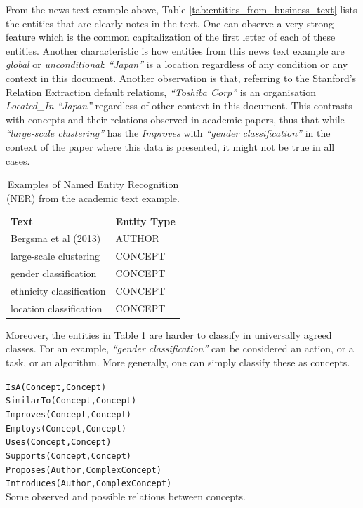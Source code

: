 \documentclass[11pt,a4paper,openright]{memoir}
\begin{document}
From the news text example above, Table \ref{tab:entities_from_business_text} lists the entities that are clearly notes in the text. One can observe a very strong feature which is the common capitalization of the first letter of each of these entities. Another characteristic is how entities from this news text example are \emph{global} or \emph{unconditional}: \emph{\enquote{Japan}} is a location regardless of any condition or any context in this document. Another observation is that, referring to the Stanford's Relation Extraction default relations, \emph{\enquote{Toshiba Corp}} is an organisation \emph{Located\_In} \emph{\enquote{Japan}} regardless of other context in this document. This contrasts with concepts and their relations observed in academic papers, thus that while \emph{\enquote{large-scale clustering}} has the \emph{Improves} with \emph{\enquote{gender classification}} in the context of the paper where this data is presented, it might not be true in all cases.

\begin{table}[!htbp]
  \centering
    \begin{tabular}{ll}
      \textbf{Text}             & \textbf{Entity Type} \\
      Bergsma et al (2013)      & AUTHOR          \\
      large-scale clustering    & CONCEPT         \\
      gender classification     & CONCEPT         \\
      ethnicity classification  & CONCEPT         \\
      location classification   & CONCEPT         \\
    \end{tabular}
  \caption[NER from the academic text example.]{Examples of Named Entity Recognition (NER) from the academic text example.}
  \label{tab:entities_from_academic_text}
\end{table}

Moreover, the entities in Table \ref{tab:entities_from_academic_text} are harder to classify in universally agreed classes. For an example, \emph{\enquote{gender classification}} can be considered an action, or a task, or an algorithm. More generally, one can simply classify these as concepts.

\begin{table}[!htbp]
  \centering
  \RaggedRight
    \texttt{IsA(Concept,Concept)} \\
    \texttt{SimilarTo(Concept,Concept)} \\
    \texttt{Improves(Concept,Concept)} \\
    \texttt{Employs(Concept,Concept)} \\
    \texttt{Uses(Concept,Concept)} \\
    \texttt{Supports(Concept,Concept)} \\
    \texttt{Proposes(Author,ComplexConcept)} \\
    \texttt{Introduces(Author,ComplexConcept)} \\
  \caption[Some observed and possible relations between concepts.]{Some observed and possible relations between concepts.}
  \label{tab:possible_academic_relations}
\end{table}
\end{document}

